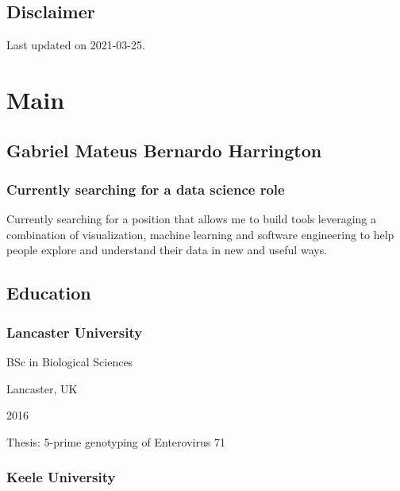 \documentclass[
]{article}
\begin{document}
\hypertarget{disclaimer}{%
\subsection{Disclaimer}\label{disclaimer}}

Last updated on 2021-03-25.

\hypertarget{main}{%
\section{Main}\label{main}}

\hypertarget{title}{%
\subsection{Gabriel Mateus Bernardo Harrington}\label{title}}

\hypertarget{currently-searching-for-a-data-science-role}{%
\subsubsection{Currently searching for a data science
role}\label{currently-searching-for-a-data-science-role}}

Currently searching for a position that allows me to build tools
leveraging a combination of visualization, machine learning and software
engineering to help people explore and understand their data in new and
useful ways.

\hypertarget{education}{%
\subsection{Education}\label{education}}

\hypertarget{lancaster-university}{%
\subsubsection{Lancaster University}\label{lancaster-university}}

BSc in Biological Sciences

Lancaster, UK

2016

Thesis: 5-prime genotyping of Enterovirus 71

\hypertarget{keele-university}{%
\subsubsection{Keele University}\label{keele-university}}
\end{document}
